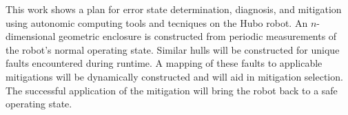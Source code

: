 This work shows a plan for error state determination, diagnosis, and mitigation
using autonomic computing tools and tecniques on the Hubo robot. An
$n$-dimensional geometric enclosure is constructed from periodic measurements
of the robot's normal operating state. Similar hulls will be constructed for
unique faults encountered during runtime. A mapping of these faults to
applicable mitigations will be dynamically constructed and will aid in
mitigation selection. The successful application of the mitigation will bring
the robot back to a safe operating state.
